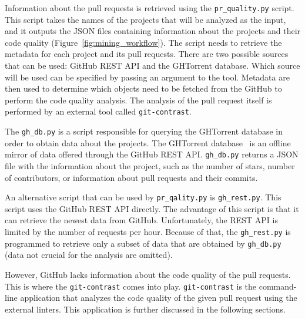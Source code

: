 \documentclass[digital,oneside,oldtable,nolof,nolot,nocover]{fithesis4}
\begin{document}
Information about the pull requests is retrieved using the \texttt{pr\_quality.py}
script. This script takes the names of the projects that will be analyzed as the
input, and it outputs the JSON files containing information about the projects
and their code quality (Figure~\ref{fig:mining_workflow}). The script
needs to retrieve the metadata for each project and its pull requests. There
are two possible sources that can be used: GitHub REST API and the GHTorrent
database. Which source will be used can be specified by passing an argument to
the tool. Metadata are then used to determine which objects need to be
fetched from the GitHub to perform the code quality analysis. The analysis of
the pull request itself is performed by an external tool called \texttt{git-contrast}.

The \texttt{gh\_db.py} is a script responsible for querying the GHTorrent database in order to
obtain data about the projects. The GHTorrent database~\cite{ghtorrent} is an offline mirror of
data offered through the GitHub REST API. \texttt{gh\_db.py} returns a JSON file
with the information about the project, such as the number of stars, number of
contributors, or information about pull requests and their commits.

An alternative script that can be used by \texttt{pr\_qality.py} is \texttt{gh\_rest.py}.
This script uses the GitHub REST API directly. The advantage of this
script is that it can retrieve the newest data from GitHub. Unfortunately,
the REST API is limited by the number of requests per hour. Because of that,
the \texttt{gh\_rest.py} is programmed to retrieve only a subset of data that are
obtained by \texttt{gh\_db.py} (data not crucial for the analysis are
omitted).

However, GitHub lacks information about the code quality of
the pull requests. This is where the \texttt{git-contrast} comes into play.
\texttt{git-contrast} is the command-line application that analyzes the code quality
of the given pull request using the external linters. This application is
further discussed in the following sections.
\end{document}
